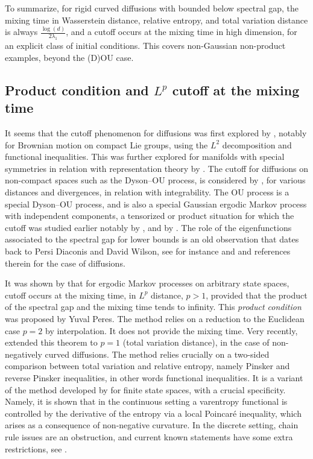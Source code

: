 \documentclass[10pt,reqno]{amsart}
\numberwithin{equation}{section}
\begin{document}
To summarize, for rigid curved diffusions with bounded below spectral gap, the mixing time in Wasserstein distance, relative entropy, and total variation distance is always $\frac{\log(d)}{2\lambda_1}$, and a cutoff occurs at the mixing time in high dimension, for an explicit class of initial conditions. This covers non-Gaussian non-product examples, beyond the (D)OU case.

\subsection{Product condition and \texorpdfstring{$L^p$}{Lp} cutoff at the mixing time}

It seems that the cutoff phenomenon for diffusions was first explored by
\cite{Saloff94}, notably for Brownian motion on compact Lie groups, using the
$L^2$ decomposition and functional inequalities. This was further explored for
manifolds with special symmetries in relation with representation theory by
\cite{Meliot14}. The cutoff for diffusions on non-compact spaces such as the
Dyson--OU process, is considered by \cite{BCL23}, for various distances
and divergences, in relation with integrability. The OU process is a special
Dyson--OU process, and is also a special Gaussian ergodic Markov process
with independent components, a tensorized or product situation for which the
cutoff was studied earlier notably by \cite{MR2203823,MR2260742}, and by
\cite{MR3770869}. The role of the eigenfunctions associated to the spectral
gap for lower bounds is an old observation that dates back to Persi Diaconis
and David Wilson, see for instance \cite{Saloff94} and \cite{BCL23} and
references therein for the case of diffusions.

It was shown by \cite{MR2375599} that for
ergodic Markov processes on arbitrary state spaces, cutoff occurs at the
mixing time, in $L^p$ distance, $p>1$, provided that the product of the
spectral gap and the mixing time tends to infinity. This \emph{product
  condition} was proposed by Yuval Peres. The method relies on a reduction to
the Euclidean case $p=2$ by interpolation. It does not provide the mixing time. Very recently,
\cite{salez-2025} extended this theorem to $p=1$ (total variation distance),
in the case of non-negatively curved diffusions. The method relies crucially
on a two-sided comparison between total variation and relative entropy, namely
Pinsker and reverse Pinsker inequalities, in other words functional
inequalities. It is a variant of the method developed by \cite{Salez24} for
finite state spaces, with a crucial specificity. Namely, it is shown that in
the continuous setting a varentropy functional is controlled by the derivative
of the entropy via a local Poincar\'e inequality, which arises as a
consequence of non-negative curvature. In the discrete setting, chain rule
issues are an obstruction, and current known statements have some extra
restrictions, see \cite{pedrotti-2025}.
\end{document}
